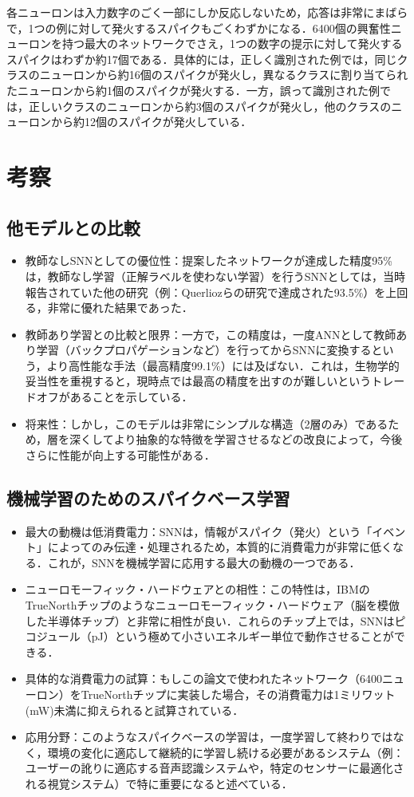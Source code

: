 \documentclass[a4paper, titlepage]{jsarticle}
\begin{document}
\par
各ニューロンは入力数字のごく一部にしか反応しないため，応答は非常にまばらで，1つの例に対して発火するスパイクもごくわずかになる．6400個の興奮性ニューロンを持つ最大のネットワークでさえ，1つの数字の提示に対して発火するスパイクはわずか約17個である．具体的には，正しく識別された例では，同じクラスのニューロンから約16個のスパイクが発火し，異なるクラスに割り当てられたニューロンから約1個のスパイクが発火する．一方，誤って識別された例では，正しいクラスのニューロンから約3個のスパイクが発火し，他のクラスのニューロンから約12個のスパイクが発火している．

\section{考察}
\subsection{他モデルとの比較}
\begin{itemize}
   \item 教師なしSNNとしての優位性：提案したネットワークが達成した精度95\%は，教師なし学習（正解ラベルを使わない学習）を行うSNNとしては，当時報告されていた他の研究（例：Querliozらの研究で達成された93.5\%）を上回る，非常に優れた結果であった．
   \item 教師あり学習との比較と限界：一方で，この精度は，一度ANNとして教師あり学習（バックプロパゲーションなど）を行ってからSNNに変換するという，より高性能な手法（最高精度99.1\%）には及ばない．これは，生物学的妥当性を重視すると，現時点では最高の精度を出すのが難しいというトレードオフがあることを示している．
   \item 将来性：しかし，このモデルは非常にシンプルな構造（2層のみ）であるため，層を深くしてより抽象的な特徴を学習させるなどの改良によって，今後さらに性能が向上する可能性がある．
\end{itemize}
\subsection{機械学習のためのスパイクベース学習}
\begin{itemize}
   \item 最大の動機は低消費電力：SNNは，情報がスパイク（発火）という「イベント」によってのみ伝達・処理されるため，本質的に消費電力が非常に低くなる．これが，SNNを機械学習に応用する最大の動機の一つである．
   \item ニューロモーフィック・ハードウェアとの相性：この特性は，IBMのTrueNorthチップのようなニューロモーフィック・ハードウェア（脳を模倣した半導体チップ）と非常に相性が良い．これらのチップ上では，SNNはピコジュール（pJ）という極めて小さいエネルギー単位で動作させることができる．
   \item 具体的な消費電力の試算：もしこの論文で使われたネットワーク（6400ニューロン）をTrueNorthチップに実装した場合，その消費電力は1ミリワット(mW)未満に抑えられると試算されている．
   \item 応用分野：このようなスパイクベースの学習は，一度学習して終わりではなく，環境の変化に適応して継続的に学習し続ける必要があるシステム（例：ユーザーの訛りに適応する音声認識システムや，特定のセンサーに最適化される視覚システム）で特に重要になると述べている．
\end{itemize}
\end{document}
